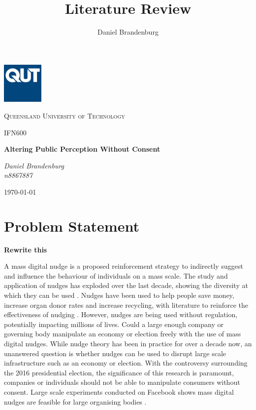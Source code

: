 \documentclass[11pt]{article} %
\title{Literature Review}
\author{Daniel Brandenburg}
\date{} %
\newcommand{\titlehere}{Altering Public Perception Without Consent}
\newcommand{\unithere}{IFN600}
\newcommand{\authorhere}{Daniel Brandenburg \\ n8867887}
\begin{document}
\begin{titlepage}
	\centering
	\includegraphics[width=0.15\textwidth]{qut}\par\vspace{1cm}
	{\scshape\LARGE Queensland University of Technology \par}
	\vspace{1cm}
	{\scshape\Large \unithere\par}
	\vspace{1.5cm}
	{\huge\bfseries \titlehere \par}
	\vspace{2cm}
	{\Large\itshape \authorhere \par}

	\vfill

	{\large \today\par}
\end{titlepage}

\newpage
\section{Problem Statement}

\textbf{Rewrite this}\par
A mass digital nudge is a proposed reinforcement strategy to indirectly suggest and influence the behaviour of individuals on a mass scale.  The study and application of nudges has exploded over the last decade, showing the diversity at which they can be used \citep{WhoNudge}. Nudges have been used to help people save money, increase organ donor rates and increase recycling, with literature to reinforce the effectiveness of nudging \citep{PrivateSector}. However, nudges are being used without regulation, potentially impacting millions of lives. Could a large enough company or governing body manipulate an economy or election freely with the use of mass digital nudges. While nudge theory has been in practice for over a decade now, an unanswered question is whether nudges can be used to disrupt large scale infrastructure such as an economy or election. With the controversy surrounding the 2016 presidential election, the significance of this research is paramount, companies or individuals should not be able to manipulate consumers without consent. Large scale experiments conducted on Facebook shows mass digital nudges are feasible for large organising bodies \citep{BehaveNudge}.\par
\end{document}
